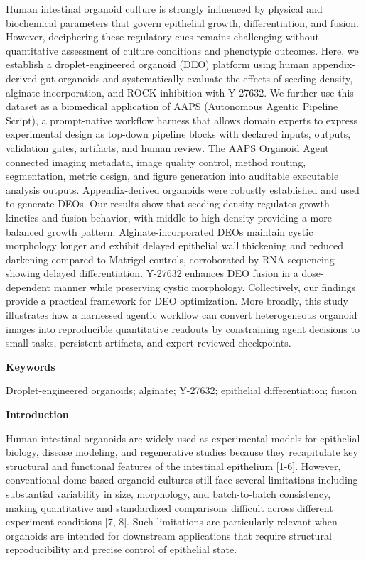 \documentclass[
]{article}
\begin{document}
Human intestinal organoid culture is strongly influenced by physical and biochemical parameters that govern epithelial growth, differentiation, and fusion. However, deciphering these regulatory cues remains challenging without quantitative assessment of culture conditions and phenotypic outcomes. Here, we establish a droplet-engineered organoid (DEO) platform using human appendix-derived gut organoids and systematically evaluate the effects of seeding density, alginate incorporation, and ROCK inhibition with Y-27632. We further use this dataset as a biomedical application of AAPS (Autonomous Agentic Pipeline Script), a prompt-native workflow harness that allows domain experts to express experimental design as top-down pipeline blocks with declared inputs, outputs, validation gates, artifacts, and human review. The AAPS Organoid Agent connected imaging metadata, image quality control, method routing, segmentation, metric design, and figure generation into auditable executable analysis outputs. Appendix-derived organoids were robustly established and used to generate DEOs. Our results show that seeding density regulates growth kinetics and fusion behavior, with middle to high density providing a more balanced growth pattern. Alginate-incorporated DEOs maintain cystic morphology longer and exhibit delayed epithelial wall thickening and reduced darkening compared to Matrigel controls, corroborated by RNA sequencing showing delayed differentiation. Y-27632 enhances DEO fusion in a dose-dependent manner while preserving cystic morphology. Collectively, our findings provide a practical framework for DEO optimization. More broadly, this study illustrates how a harnessed agentic workflow can convert heterogeneous organoid images into reproducible quantitative readouts by constraining agent decisions to small tasks, persistent artifacts, and expert-reviewed checkpoints.

\textbf{Keywords}

Droplet-engineered organoids; alginate; Y-27632; epithelial differentiation; fusion

\textbf{Introduction}

Human intestinal organoids are widely used as experimental models for epithelial biology, disease modeling, and regenerative studies because they recapitulate key structural and functional features of the intestinal epithelium {[}1-6{]}. However, conventional dome-based organoid cultures still face several limitations including substantial variability in size, morphology, and batch-to-batch consistency, making quantitative and standardized comparisons difficult across different experiment conditions {[}7, 8{]}. Such limitations are particularly relevant when organoids are intended for downstream applications that require structural reproducibility and precise control of epithelial state.
\end{document}
